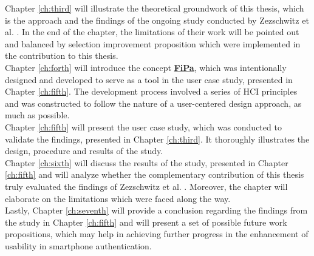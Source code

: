 Chapter \ref{ch:third} will illustrate the theoretical groundwork of this thesis, which is the approach and the findings of the ongoing study conducted by Zezschwitz et al. \cite{Zezschwitz}. In the end of the chapter, the limitations of their work will be pointed out and balanced by selection improvement proposition which were implemented in the contribution to this thesis.\\

Chapter \ref{ch:forth} will introduce the concept \underline{\textbf{FiPa}}, which was intentionally designed and developed to serve as a tool in the user case study, presented in Chapter \ref{ch:fifth}. The development process involved a series of HCI principles and was constructed to follow the nature of a user-centered design approach, as much as possible. \\

Chapter \ref{ch:fifth} will present the user case study, which was conducted to validate the findings, presented in Chapter \ref{ch:third}.
It thoroughly illustrates the design, procedure and results of the study.\\

Chapter \ref{ch:sixth} will discuss the results of the study, presented in Chapter \ref{ch:fifth} and will analyze whether the complementary contribution of this thesis truly evaluated the findings of Zezschwitz et al. \cite{Zezschwitz}. Moreover, the chapter will elaborate on the limitations which were faced along the way. \\
 
Lastly, Chapter \ref{ch:seventh} will provide a conclusion regarding the findings from the study in Chapter \ref{ch:fifth} and will present a set of possible future work propositions, which may help in achieving further progress in the enhancement of usability in smartphone authentication.






